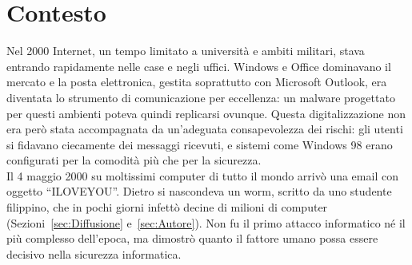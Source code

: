 \section{Contesto}\label{Contesto}
Nel 2000 Internet, un tempo limitato a università e ambiti militari, stava entrando rapidamente nelle case e negli uffici. Windows e Office dominavano il mercato e la posta elettronica, gestita soprattutto con Microsoft Outlook, era diventata lo strumento di comunicazione per eccellenza: un malware progettato per questi ambienti poteva quindi replicarsi ovunque.
Questa digitalizzazione non era però stata accompagnata da un'adeguata consapevolezza dei rischi: gli utenti si fidavano ciecamente dei messaggi ricevuti, e sistemi come Windows 98 erano configurati per la comodità più che per la sicurezza.\\
Il 4 maggio 2000 su moltissimi computer di tutto il mondo arrivò una email con oggetto ``ILOVEYOU''.
Dietro si nascondeva un worm, scritto da uno studente filippino, che in pochi giorni infettò decine di milioni di computer (Sezioni~\ref{sec:Diffusione} e~\ref{sec:Autore}).
Non fu il primo attacco informatico né il più complesso dell'epoca, ma dimostrò quanto il fattore umano possa essere decisivo nella sicurezza informatica.
